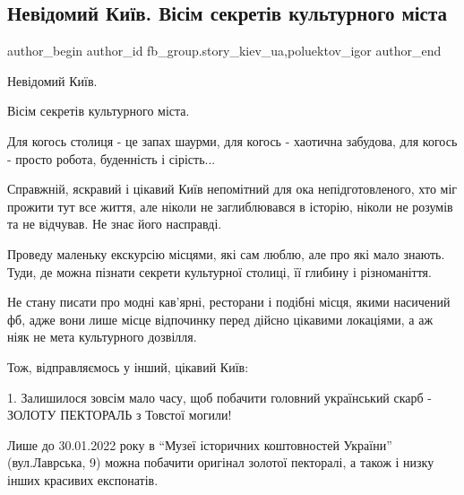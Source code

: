  
 
 
 
 
 
\subsection{Невідомий Київ. Вісім секретів культурного міста}
\label{sec:28_01_2022.fb.fb_group.story_kiev_ua.1.kiev_visim_sekretiv}
 
\ifcmt
 author_begin
   author_id fb_group.story_kiev_ua,poluektov_igor
 author_end
\fi

Невідомий Київ.

Вісім секретів культурного міста.

Для когось столиця - це запах шаурми, для когось - хаотична забудова, для
когось - просто робота, буденність і сірість...

Справжній, яскравий і цікавий Київ непомітний для ока непідготовленого, хто міг
прожити тут все життя, але ніколи не заглиблювався в історію, ніколи не розумів
та не відчував. Не знає його насправді.


Проведу маленьку екскурсію місцями, які сам люблю, але про які мало знають.
Туди, де можна пізнати секрети культурної столиці, її глибину і різноманіття. 

Не стану писати про модні кав’ярні, ресторани і подібні місця, якими насичений
фб, адже вони лише місце відпочинку перед дійсно цікавими локаціями, а аж ніяк
не мета культурного дозвілля. 


Тож, відправляємось у інший, цікавий Київ:

1. Залишилося зовсім мало часу, щоб побачити головний український скарб -
ЗОЛОТУ ПЕКТОРАЛЬ з Товстої могили!

Лише до 30.01.2022 року в \enquote{Музеї історичних коштовностей України}
(вул.Лаврська, 9) можна побачити оригінал золотої пекторалі, а також і низку
інших красивих експонатів. 

